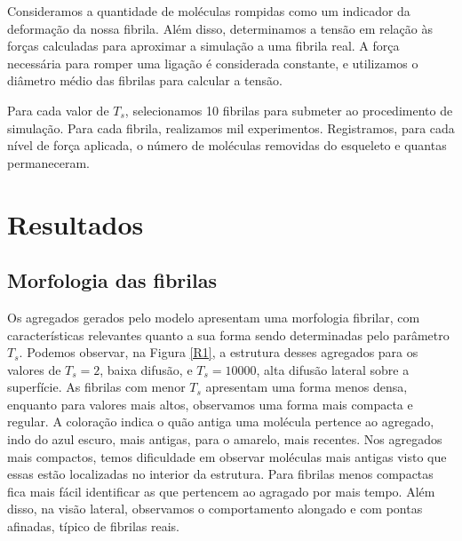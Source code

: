 \documentclass{article}
\begin{document}
      
        Consideramos a quantidade de moléculas rompidas como um indicador da deformação da nossa fibrila. Além disso, determinamos a tensão em relação 
        às forças calculadas para aproximar a simulação a uma fibrila real. A força necessária para romper uma ligação é considerada constante, e 
        utilizamos o diâmetro médio das fibrilas para calcular a tensão. 

        Para cada valor de \(T_{s}\), selecionamos 10 fibrilas para submeter ao procedimento de simulação. Para cada fibrila, realizamos mil 
        experimentos. Registramos, para cada nível de força aplicada, o número de moléculas removidas do esqueleto e quantas permaneceram. 
        


\section{Resultados}
    \subsection{Morfologia das fibrilas}

    Os agregados gerados pelo modelo apresentam uma morfologia fibrilar, com características relevantes quanto a sua forma 
    sendo determinadas pelo parâmetro \(T_{s}\). Podemos observar, na Figura \ref{R1}, a estrutura desses agregados 
    para os valores de \(T_{s} = 2\), baixa difusão, e \(T_{s} = 10000\), alta difusão lateral sobre a superfície. As 
    fibrilas com menor \(T_{s}\) apresentam uma forma menos densa, enquanto para valores mais altos, observamos uma 
    forma mais compacta e regular. A coloração indica o quão antiga uma molécula pertence ao agregado, indo do azul 
    escuro, mais antigas, para o amarelo, mais recentes. Nos agregados mais compactos, temos dificuldade em observar 
    moléculas mais antigas visto que essas estão localizadas no interior da estrutura. Para fibrilas menos compactas fica 
    mais fácil identificar as que pertencem ao agragado por mais tempo. Além disso, na visão lateral, observamos o 
    comportamento alongado e com pontas afinadas, típico de fibrilas reais. 
\end{document}
